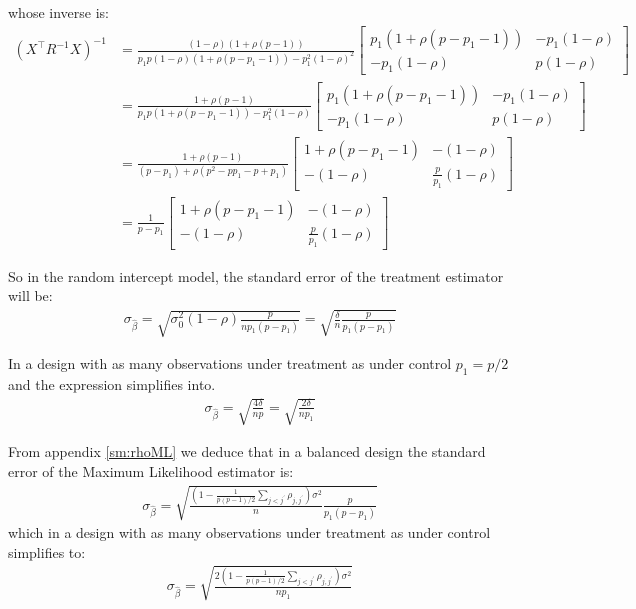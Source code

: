 \documentclass[12pt]{article}
\newcommand\trans[1]{{#1}^\intercal}%
\begin{document}
whose inverse is:
\begin{align*}
\left(\trans{X} R^{-1} X\right)^{-1} &= \frac{(1-\rho)(1+\rho(p-1))}{p_1 p (1-\rho)(1+\rho (p-p_1-1)) - p^2_1(1-\rho)^2} \begin{bmatrix} p_1(1+\rho (p-p_1-1))
                  & -p_1(1-\rho)
                  \\ -p_1(1-\rho)
                  & p(1-\rho)
\end{bmatrix} \\
&= \frac{1+\rho(p-1)}{p_1 p (1+\rho (p-p_1-1)) - p^2_1(1-\rho)} \begin{bmatrix} p_1(1+\rho (p-p_1-1))
                  & -p_1(1-\rho)
                  \\ -p_1(1-\rho)
                  & p(1-\rho)
\end{bmatrix} \\
&= \frac{1+\rho(p-1)}{(p - p_1) + \rho (p^2-p p_1-p+p_1)} \begin{bmatrix} 1+\rho (p-p_1-1)
                  & -(1-\rho)
                  \\ -(1-\rho)
                  & \frac{p}{p_1}(1-\rho)
\end{bmatrix} \\
&= \frac{1}{p-p_1} \begin{bmatrix} 1+\rho (p-p_1-1)
                  & -(1-\rho)
                  \\ -(1-\rho)
                  & \frac{p}{p_1}(1-\rho)
\end{bmatrix}   
\end{align*}

So in the random intercept model, the standard error of the treatment
estimator will be:
\begin{align*}
\sigma_{\widehat{\beta}} = \sqrt{\sigma_0^2(1-\rho) \frac{p}{n p_1(p-p_1)}}=\sqrt{\frac{\delta}{n} \frac{p}{p_1(p-p_1)}}
\end{align*}

In a design with as many observations under treatment as under control \(p_1=p/2\) and the expression simplifies into.
\begin{align*}
\sigma_{\widehat{\beta}} = \sqrt{\frac{4\delta}{np}} = \sqrt{\frac{2\delta}{np_1}}
\end{align*}

From appendix \ref{sm:rhoML} we deduce that in a balanced design the
standard error of the Maximum Likelihood estimator is:
\begin{align*}
\sigma_{\widehat{\beta}} = \sqrt{\frac{\left(1-\frac{1}{p(p-1)/2}\sum_{j < j^{\prime}} \rho_{j,j^{\prime}}\right) \sigma^2}{n}\frac{p}{p_1(p-p_1)}}
\end{align*}
which in a design with as many observations under treatment as under control simplifies to:
\begin{align*}
\sigma_{\widehat{\beta}} = \sqrt{\frac{2\left(1-\frac{1}{p(p-1)/2}\sum_{j < j^{\prime}} \rho_{j,j^{\prime}}\right) \sigma^2}{n p_1}}
\end{align*}


\clearpage
\end{document}

